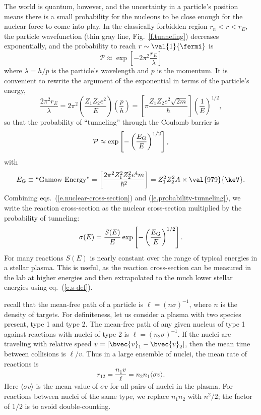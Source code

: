 The world is quantum, however, and the uncertainty in a particle's position means there is a small probability for the nucleons to be close enough for the nuclear force to come into play. In the classically forbidden region $r_{n} < r < r_{E}$, the particle wavefunction (thin gray line, Fig.~\ref{f.tunneling}) decreases exponentially, and the probability to reach $r\sim\val{1}{\fermi}$ is
\[ \mathcal{P}\approx \exp\left[-2\pi^{2}\frac{r_{E}}{\lambda}\right] \]
where $\lambda = h/p$ is the particle's wavelength and $p$ is the momentum.
It is convenient to rewrite the argument of the exponential in terms of the particle's energy,
\[ \frac{2\pi^{2}r_{E}}{\lambda} = 2\pi^{2}\left(\frac{Z_{1}Z_{2}e^{2}}{E}\right)
	\left(\frac{p}{h}\right) = \left[\pi \frac{Z_{1}Z_{2}e^{2}\sqrt{2m}}{\hbar}\right]\left(\frac{1}{E}\right)^{1/2}, \]
so that the probability of ``tunneling'' through the Coulomb barrier is
\begin{equation}\label{e.probability-tunneling}
\mathcal{P} \approx \exp\left[-\left(\frac{E_{\mathrm{G}}}{E}\right)^{1/2}\right],
\end{equation}
with
\[ \EG \equiv \textrm{``Gamow Energy''} = \left[\frac{2\pi^{2}Z_{1}^{2}Z_{2}^{2}e^{4}m}{\hbar^{2}}\right] = Z_{1}^{2}Z_{2}^{2}A \times \val{979}{\keV}.
\]
Combining eqs.~(\ref{e.nuclear-cross-section}) and (\ref{e.probability-tunneling}), we write the reaction cross-section as the nuclear cross-section multiplied by the probability of tunneling:
\begin{equation}\label{e.s-def}
\sigma(E) = \frac{S(E)}{E}\exp\left[-\left(\frac{E_{\mathrm{G}}}{E}\right)^{1/2}\right].
\end{equation}
For many reactions $S(E)$ is nearly constant over the range of typical energies in a stellar plasma. This is useful, as the reaction cross-section can be measured in the lab at higher energies and then extrapolated to the much lower stellar energies using eq.~(\ref{e.s-def}).

 recall that the mean-free path of a particle is $\ell = (n\sigma)^{-1}$, where $n$ is the density of targets. For definiteness, let us consider a plasma with two species present, type 1 and type 2. The mean-free path of any given nucleus of type 1 against reactions with nuclei of type 2 is $\ell = (n_{2}\sigma)^{-1}$. If the nuclei are traveling with relative speed $v = |\bvec{v}_{1}-\bvec{v}_{2}|$, then the mean time between collisions is $\ell/v$. Thus in a large ensemble of nuclei, the mean rate of reactions is
\[
	r_{12} = \frac{n_{1} v}{\ell} = n_{2}n_{1}\langle\sigma v\rangle.
\]
Here $\langle \sigma v\rangle$ is the mean value of $\sigma v$ for all pairs of nuclei in the plasma. For reactions between nuclei of the same type, we replace $n_{1}n_{2}$ with $n^{2}/2$; the factor of $1/2$ is to avoid double-counting.

